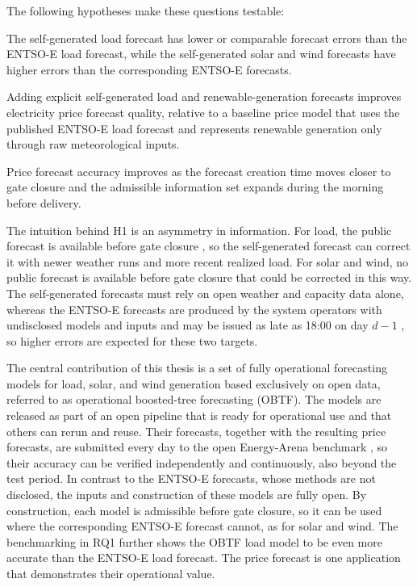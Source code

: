 The following hypotheses make these questions testable:

\begin{description}
  \setlength{\itemsep}{0.15em}
  \setlength{\parsep}{0pt}
  \setlength{\topsep}{0.25em}
  \item[\textbf{H1:}]\hypertarget{hyp:component_forecast_quality}{}
  The self-generated load forecast has lower or comparable forecast errors than the
  \mbox{ENTSO-E} load forecast, while the self-generated solar and wind forecasts
  have higher errors than the corresponding \mbox{ENTSO-E} forecasts.

  \item[\textbf{H2:}]\hypertarget{hyp:price_impact_generated_forecasts}{}
  Adding explicit self-generated load and renewable-generation forecasts improves
  electricity price forecast quality, relative to a baseline price model that
  uses the published \mbox{ENTSO-E} load forecast and represents renewable
  generation only through raw meteorological inputs.

  \item[\textbf{H3:}]\hypertarget{hyp:cutoff_sensitivity}{}
  Price forecast accuracy improves as the forecast creation time moves closer to
  gate closure and the admissible information set expands during the morning
  before delivery.
\end{description}

The intuition behind H1 is an asymmetry in information. For load, the public
forecast is available before gate closure \cite{euRegulation543_2013}, so
the self-generated forecast can correct it with newer weather runs and more
recent realized load. For solar and wind, no public forecast is available before
gate closure that could be corrected in this way. The self-generated forecasts must rely on open weather and capacity
data alone, whereas the \mbox{ENTSO-E} forecasts are produced by the system
operators with undisclosed models and inputs and may be issued as late as 18:00
on day \(d-1\) \cite{euRegulation543_2013,entsoeTransparency}, so higher errors
are expected for these two targets.

The central contribution of this thesis is a set of fully operational forecasting
models for load, solar, and wind generation based exclusively on open data,
referred to as operational boosted-tree forecasting (OBTF). The
models are released as part of an open pipeline that is ready for operational
use and that others can rerun and reuse. Their forecasts, together with the resulting price forecasts, are
submitted every day to the open Energy-Arena benchmark
\cite{kleinebrahm2026energyarena}, so their accuracy can be verified
independently and continuously, also beyond the test period. In contrast to
the \mbox{ENTSO-E} forecasts, whose methods are not disclosed, the inputs and
construction of these models are fully open. By construction, each model
is admissible before gate closure, so it can be used where the corresponding
\mbox{ENTSO-E} forecast cannot, as for solar and wind. The benchmarking in RQ1
further shows the OBTF load model to be even more accurate than the \mbox{ENTSO-E}
load forecast. The price forecast is one application that demonstrates their
operational value.

